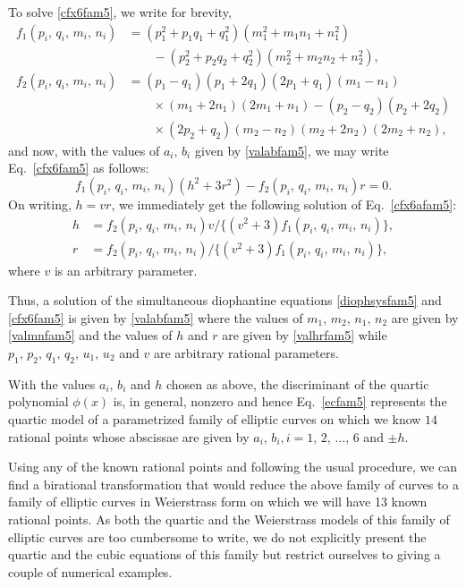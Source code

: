\documentclass[11pt, leqno]{article}
\begin{document}
To solve \eqref{cfx6fam5}, we write for brevity,
\begin{equation}
\begin{aligned}
f_1(p_i,\,q_i,\,m_i,\,n_i)&=(p_1^2+p_1q_1+q_1^2)(m_1^2+m_1n_1+n_1^2)\\
& \quad \quad -(p_2^2+p_2q_2+q_2^2)(m_2^2+m_2n_2+n_2^2),\\
f_2(p_i,\,q_i,\,m_i,\,n_i)&=(p_1-q_1)(p_1+2q_1)(2p_1+q_1)(m_1-n_1)\\
& \quad \quad \times (m_1+2n_1)(2m_1+n_1) -(p_2-q_2)(p_2+2q_2)\\
& \quad \quad \times (2p_2+q_2)(m_2-n_2)(m_2+2n_2)(2m_2+n_2),
\end{aligned}
\end{equation}
and now, with the values of $a_i,\,b_i$ given by \eqref{valabfam5}, we may write Eq.~\eqref{cfx6fam5} as follows:
\begin{equation}
f_1(p_i,\,q_i,\,m_i,\,n_i)(h^2+3r^2)-f_2(p_i,\,q_i,\,m_i,\,n_i)r=0. \label{cfx6afam5}
\end{equation}
On writing, $h=vr$, we immediately get the following solution of Eq.~\eqref{cfx6afam5}:
\begin{equation}
\begin{aligned}
h&=f_2(p_i,\,q_i,\,m_i,\,n_i)v/\{(v^2+3)f_1(p_i,\,q_i,\,m_i,\,n_i)\},\\
r&=f_2(p_i,\,q_i,\,m_i,\,n_i)/\{(v^2+3)f_1(p_i,\,q_i,\,m_i,\,n_i)\},
\end{aligned}
\label{valhrfam5}
\end{equation}
where $v$ is an arbitrary parameter. 


Thus, a solution of the simultaneous diophantine equations \eqref{diophsysfam5} and \eqref{cfx6fam5} is given by \eqref{valabfam5} where 
the values of $m_1,\,m_2,\,n_1,\,n_2$ are given by \eqref{valmnfam5} and the values of $h$ and $r$ are given by \eqref{valhrfam5} while   
$p_1,\,p_2,\,q_1,\,q_2,\,u_1,\,u_2$ and $v$ are arbitrary rational parameters.

With the values $a_i,\,b_i$ and $h$ chosen as above, the discriminant of the quartic polynomial $\phi(x)$ is, in general, nonzero and hence Eq.~\eqref{ecfam5} represents the  quartic model of a parametrized family of  elliptic curves on which we know $14$ rational points whose abscissae are given by  $a_i, \,b_i, i=1,\,2,\,\ldots,\,6$ and $\pm h$.

Using any of the known rational points and following the usual procedure, we can find a birational transformation that would reduce the above family of curves to  a family of elliptic curves in Weierstrass form  on which we will have 13 known rational points. As both the quartic and the Weierstrass models of this family of elliptic curves are too cumbersome to write, we do not explicitly present  the quartic and the cubic equations of this family but restrict ourselves to giving a couple of numerical examples.
\end{document}
